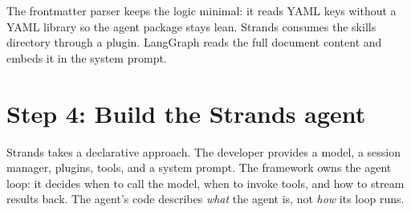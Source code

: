The frontmatter parser keeps the logic minimal: it reads YAML keys without a YAML library
so the agent package stays lean. Strands consumes the skills directory through a plugin.
LangGraph reads the full document content and embeds it in the system prompt.

\section{Step 4: Build the Strands agent}

Strands takes a declarative approach. The developer provides a model, a session manager,
plugins, tools, and a system prompt. The framework owns the agent loop: it decides when to
call the model, when to invoke tools, and how to stream results back. The agent's code
describes \emph{what} the agent is, not \emph{how} its loop runs.

